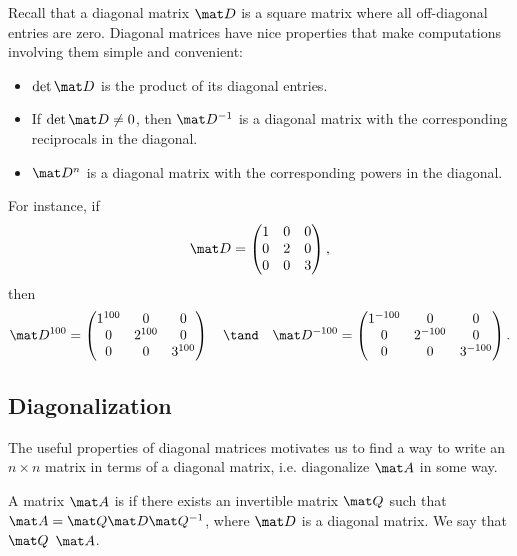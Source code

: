 Recall that a diagonal matrix $\mat D$ is a square matrix where all off-diagonal entries are zero. Diagonal matrices have nice properties that make computations involving them simple and convenient:
\begin{itemize}
    \item $\det \mat D$ is the product of its diagonal entries.
    \item If $\det \mat D \neq 0$, then $\mat D^{-1}$ is a diagonal matrix with the corresponding reciprocals in the diagonal.
    \item $\mat D^{n}$ is a diagonal matrix with the corresponding powers in the diagonal.
\end{itemize}
For instance, if \[\mat D = \begin{pmatrix}1 & 0 & 0 \\ 0 & 2 & 0 \\ 0 & 0 & 3\end{pmatrix},\] then \[\mat D^{100} = \begin{pmatrix}1^{100} & 0 & 0 \\ 0 & 2^{100} & 0 \\ 0 & 0 & 3^{100}\end{pmatrix} \quad \tand \quad \mat D^{-100} = \begin{pmatrix}1^{-100} & 0 & 0 \\ 0 & 2^{-100} & 0 \\ 0 & 0 & 3^{-100}\end{pmatrix}.\]

\subsection{Diagonalization}

The useful properties of diagonal matrices motivates us to find a way to write an $n \times n$ matrix in terms of a diagonal matrix, i.e. diagonalize $\mat A$ in some way.

\begin{definition}
    A matrix $\mat A$ is  if there exists an invertible matrix $\mat Q$ such that $\mat A = \mat Q \mat D \mat Q^{-1}$, where $\mat D$ is a diagonal matrix. We say that $\mat Q$  $\mat A$.
\end{definition}

